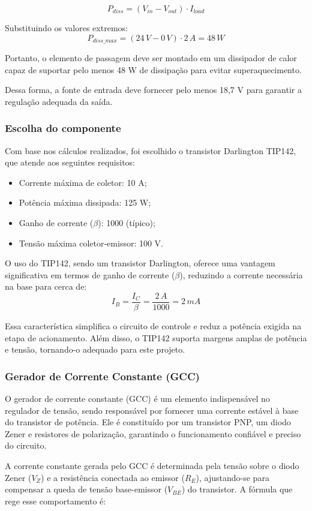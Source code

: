\[
P_{diss} = (V_{in} - V_{out}) \cdot I_{load}
\]

Substituindo os valores extremos:  
\[
P_{diss\_max} = (24\,V - 0\,V) \cdot 2\,A = 48\,W
\]

Portanto, o elemento de passagem deve ser montado em um dissipador de calor capaz de suportar pelo menos 48 W de dissipação para evitar superaquecimento.  

Dessa forma, a fonte de entrada deve fornecer pelo menos 18,7 V para garantir a regulação adequada da saída.  

\subsubsection*{Escolha do componente}  
Com base nos cálculos realizados, foi escolhido o transistor Darlington TIP142, que atende aos seguintes requisitos:  
\begin{itemize}
    \item Corrente máxima de coletor: 10 A;
    \item Potência máxima dissipada: 125 W;
    \item Ganho de corrente (\(\beta\)): 1000 (típico);
    \item Tensão máxima coletor-emissor: 100 V.
\end{itemize}

O uso do TIP142, sendo um transistor Darlington, oferece uma vantagem significativa em termos de ganho de corrente (\(\beta\)), reduzindo a corrente necessária na base para cerca de:  
\[
I_B = \frac{I_C}{\beta} = \frac{2\,A}{1000} = 2\,mA
\]

Essa característica simplifica o circuito de controle e reduz a potência exigida na etapa de acionamento. Além disso, o TIP142 suporta margens amplas de potência e tensão, tornando-o adequado para este projeto.  

\subsubsection{Gerador de Corrente Constante (GCC)}  

O gerador de corrente constante (GCC) é um elemento indispensável no regulador de tensão, sendo responsável por fornecer uma corrente estável à base do transistor de potência. Ele é constituído por um transistor PNP, um diodo Zener e resistores de polarização, garantindo o funcionamento confiável e preciso do circuito.  

A corrente constante gerada pelo GCC é determinada pela tensão sobre o diodo Zener (\(V_Z\)) e a resistência conectada ao emissor (\(R_E\)), ajustando-se para compensar a queda de tensão base-emissor (\(V_{BE}\)) do transistor. A fórmula que rege esse comportamento é:  

